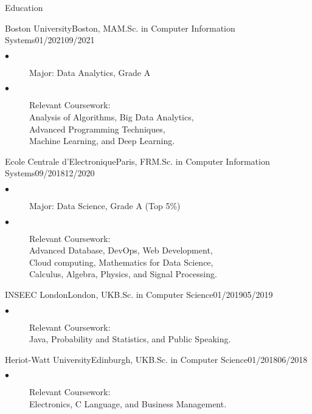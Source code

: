 \documentclass{resume}
\begin{document}
	\begin{multicols}{2}

	\begin{rSection}{\Large Education}
		\begin{school}{Boston University}{Boston, MA}{M.Sc. in Computer Information Systems}{01/2021}{09/2021}{
			\begin{description}
				\item[$\bullet$]Major:  Data Analytics, Grade A
				\item[$\bullet$]{Relevant Coursework: \\
				Analysis of Algorithms, Big Data Analytics, \\
				Advanced Programming Techniques,  \\
				Machine Learning, and Deep Learning.}
			\end{description}
		}
		\end{school}
		
		\begin{school}{Ecole Centrale d'Electronique}{Paris, FR}{M.Sc. in Computer Information Systems}{09/2018}{12/2020}{
			\begin{description}
				\item[$\bullet$]Major: Data Science, Grade A  (Top 5\%)
				\item[$\bullet$]{Relevant Coursework: \\
				Advanced Database, DevOps, Web Development,\\
				Cloud computing, Mathematics for Data Science,\\
				Calculus, Algebra, Physics, and Signal Processing.}
			\end{description}
		}
		\end{school}
		\begin{school}{INSEEC London}{London, UK}{B.Sc. in Computer Science}{01/2019}{05/2019}{
			\begin{description}
				\item[$\bullet$]{Relevant Coursework: \\
				Java, Probability and Statistics, and Public Speaking.}
			\end{description}
		}
		\end{school}
		\begin{school}{Heriot-Watt University}{Edinburgh, UK}{B.Sc. in Computer Science}{01/2018}{06/2018}{
			\begin{description}
				\item[$\bullet$]{Relevant Coursework: \\
				Electronics, C Language, and Business Management.}
			\end{description}
		}
		\end{school}
	\end{rSection}


\end{multicols}
\end{document}
